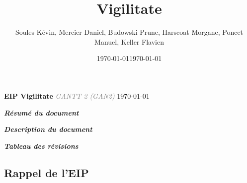 \documentclass[a4paper,12pt]{report}
\title{\doctitle{} Vigilitate}
\author{Soules Kévin, Mercier Daniel, Budowski Prune, Harscoat Morgane, Poncet Manuel, Keller Flavien}
\date{\today}
\newcommand{\doctitle}{GAN2}
\newcommand{\doclongtitle}{GANTT 2}
\begin{document}
\date{\slashdate\today}
\setcounter{page}{-3}


\thispagestyle{empty}
\begin{center}
  \textcolor{myBlue}{\Huge \textbf{EIP Vigilitate}}\linebreak
  \textcolor{gray}{\textit{\Large \doclongtitle{} (\doctitle{})}}\linebreak
  {\today}
\end{center}
\newpage


\begin{flushleft}
  \textcolor{myBlue}{\textit{\large \textbf{Résumé du document}}}\linebreak
\end{flushleft}

\newpage


\begin{flushleft}
  \textcolor{myBlue}{\textit{\large \textbf{Description du document}}} 
  \bigbreak
  
  \bigbreak
  \bigbreak
  \textcolor{myBlue}{\textit{\large \textbf{Tableau des révisions}}}
  \bigbreak
  
\end{flushleft}


\tableofcontents


\textcolor{myBlue}{\chapter{Rappel de l'EIP}}
\setcounter{page}{1}


\end{document}
